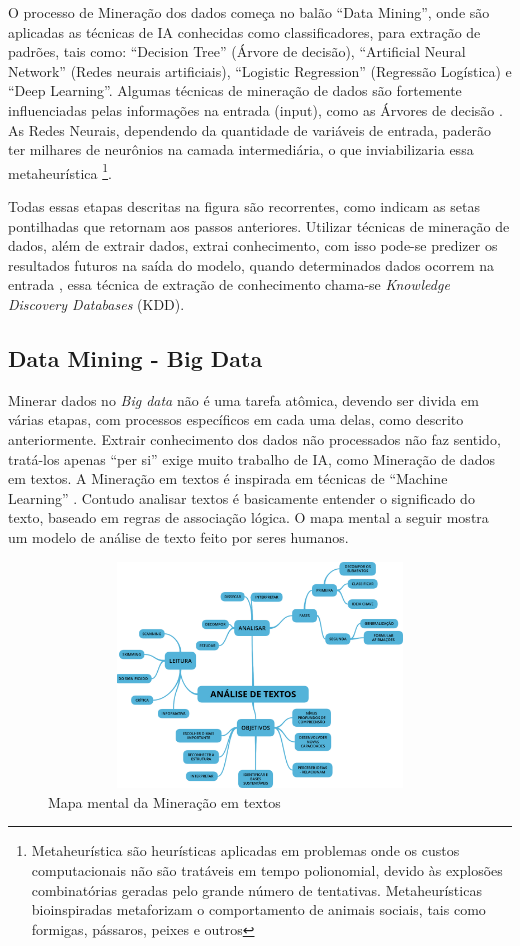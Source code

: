 O processo de Mineração dos dados começa no balão ``Data Mining'', onde são aplicadas as técnicas de IA conhecidas como classificadores, para extração de padrões, tais como: 
``Decision Tree'' (Árvore de decisão), ``Artificial Neural Network'' (Redes neurais artificiais), ``Logistic Regression'' (Regressão Logística) e ``Deep Learning''.
Algumas técnicas de mineração de dados são fortemente influenciadas pelas informações na entrada (input), como as Árvores de decisão \cite{DecisionTree}. 
As Redes Neurais, dependendo da quantidade de variáveis de entrada, paderão ter milhares de neurônios na camada intermediária, o que inviabilizaria essa metaheurística 
\footnote{Metaheurística são heurísticas aplicadas em problemas onde os custos computacionais não são tratáveis em tempo polionomial, devido às explosões combinatórias geradas
pelo grande número de tentativas. Metaheurísticas bioinspiradas metaforizam o comportamento de animais sociais, tais como formigas, pássaros, peixes e outros}.

Todas essas etapas descritas na figura são recorrentes, como indicam as setas pontilhadas que retornam aos passos anteriores.
Utilizar técnicas de mineração de dados, além de extrair dados, extrai conhecimento, com isso pode-se predizer os resultados futuros na saída do modelo, 
quando determinados dados ocorrem na entrada \cite{Amin2015a}, essa técnica de extração de conhecimento chama-se \textit{Knowledge Discovery Databases} (KDD).


\subsection{Data Mining - Big Data}\label{arte:palavraChave:DataMiningBigData}

Minerar dados no \textit{Big data} não é uma tarefa atômica, devendo ser divida em várias etapas, com processos específicos em cada uma delas, como descrito anteriormente. 
Extrair conhecimento dos dados não processados não faz sentido, tratá-los apenas ``per si'' exige muito trabalho de IA, como Mineração de dados em textos. 
A Mineração em textos é inspirada em técnicas de ``Machine Learning'' \cite{Aranha2006}. 
Contudo analisar textos é basicamente entender o significado do texto, baseado em regras de associação lógica.
O mapa mental a seguir mostra um modelo de análise de texto feito por seres humanos.

\begin{figure}[htpb]
\centering
\caption{Mapa mental da Mineração em textos}
\includegraphics[width=120mm, height=60mm]{Figuras/BigData/Analise_Textos.png}
\end{figure}


